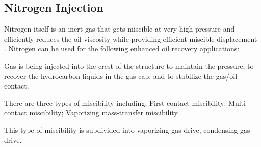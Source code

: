 \subsection{ Nitrogen Injection}
Nitrogen itself is an inert gas that gets miscible at very 
high pressure and efficiently reduces the oil viscosity while providing efficient 
miscible displacement \citep{Syed}. Nitrogen can be used for the following
enhanced oil recovery applications: 
\begin{description}[style=nextline]
 \item [\textbf{Nitrogen immiscible flooding}]
Gas is being injected into the crest of the structure to 
maintain the pressure, to recover the hydrocarbon liquids in the gas cap, and to 
stabilize the gas/oil contact.
\item[\textbf{Nitrogen miscibility displacement mechanism}]
There are three types of miscibility including; First contact miscibility; Multi- contact miscibility; 
Vaporizing mass-transfer miscibility \citep{Shine}. 
\item[\textbf{Multi-contact miscibility}]
This type of miscibility is  subdivided into vaporizing gas drive, 
condensing gas drive\citep{Juttner}.


\end{description}
